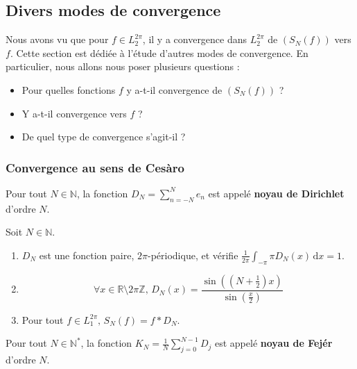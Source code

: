   \subsection{Divers modes de convergence}


  Nous avons vu que pour $f \in L_2^{2\pi}$, il y a convergence dans $L_2^{2\pi}$ de $(S_N(f))$ vers $f$. Cette section est dédiée à l'étude d'autres modes de convergence. En particulier, nous allons nous poser plusieurs questions :

  \begin{itemize}
    \item Pour quelles fonctions $f$ y a-t-il convergence de $(S_N(f))$ ?
    \item Y a-t-il convergence vers $f$ ?
    \item De quel type de convergence s'agit-il ?
  \end{itemize}

  \subsubsection{Convergence au sens de Cesàro}


  \begin{definition}
    Pour tout $N \in \mathbb{N}$, la fonction $D_N = \sum_{n=-N}^{N} e_n$ est appelé \textbf{noyau de Dirichlet} d'ordre $N$.
  \end{definition}

  \begin{proposition}
    Soit $N \in \mathbb{N}$.
    \begin{enumerate}[label={\bfseries(\roman*)}]
      \item $D_N$ est une fonction paire, $2\pi$-périodique, et vérifie $\frac{1}{2\pi} \int_{-\pi}{\pi} D_N(x) \, \mathrm{d}x = 1$.
      \item \[ \forall x \in \mathbb{R} \setminus 2 \pi \mathbb{Z}, \, D_N(x) = \frac{\sin \left(\left( N + \frac{1}{2} \right) x \right)}{\sin \left( \frac{x}{2} \right)} \]
      \item Pour tout $f \in L_1^{2 \pi}, \, S_N(f) = f * D_N$.
    \end{enumerate}
  \end{proposition}

  \begin{definition}
    Pour tout $N \in \mathbb{N}^*$, la fonction $K_N = \frac{1}{N} \sum_{j=0}^{N-1} D_j$ est appelé \textbf{noyau de Fejér} d'ordre $N$.
  \end{definition}

